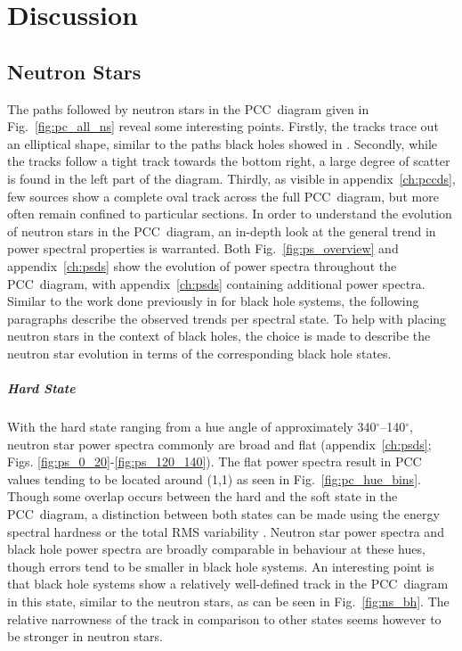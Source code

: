 \chapter{Discussion}
\label{ch:discussion}

\section{Neutron Stars}
\label{sec:dis_ns}
The paths followed by neutron stars in the \ac{PCC}~diagram given in Fig.~\ref{fig:pc_all_ns} reveal some interesting points. Firstly, the tracks trace out an elliptical shape, similar to the paths black holes showed in \citet{heil2015power}. Secondly, while the tracks follow a tight track towards the bottom right, a large degree of scatter is found in the left part of the diagram. Thirdly, as visible in appendix~\ref{ch:pccds}, few sources show a complete oval track across the full \ac{PCC}~diagram, but more often remain confined to particular sections. In order to understand the evolution of neutron stars in the \ac{PCC}~diagram, an in-depth look at the general trend in power spectral properties is warranted. Both Fig.~\ref{fig:ps_overview} and appendix~\ref{ch:psds} show the evolution of power spectra throughout the \ac{PCC}~diagram, with appendix~\ref{ch:psds} containing additional power spectra. Similar to the work done previously in \citet{heil2015power} for black hole systems, the following paragraphs describe the observed trends per spectral state. To help with placing neutron stars in the context of black holes, the choice is made to describe the neutron star evolution in terms of the corresponding black hole states. 

\paragraph{Hard State} With the hard state ranging from a hue angle of approximately 340$^\circ$--140$^\circ$, neutron star power spectra commonly are broad and flat (appendix~\ref{ch:psds}; Figs. \ref{fig:ps_0_20}-\ref{fig:ps_120_140}). The flat power spectra result in \ac{PCC} values tending to be located around (1,1) as seen in Fig.~\ref{fig:pc_hue_bins}. Though some overlap occurs between the hard and the soft state in the \ac{PCC}~diagram, a distinction between both states can be made using the energy spectral hardness or the total \ac{RMS} variability \citep{heil2015power}. Neutron star power spectra and black hole power spectra are broadly comparable in behaviour at these hues, though errors tend to be smaller in black hole systems. An interesting point is that black hole systems show a relatively well-defined track in the \ac{PCC}~diagram in this state, similar to the neutron stars, as can be seen in Fig.~\ref{fig:ns_bh}. The relative narrowness of the track in comparison to other states seems however to be stronger in neutron stars. 

